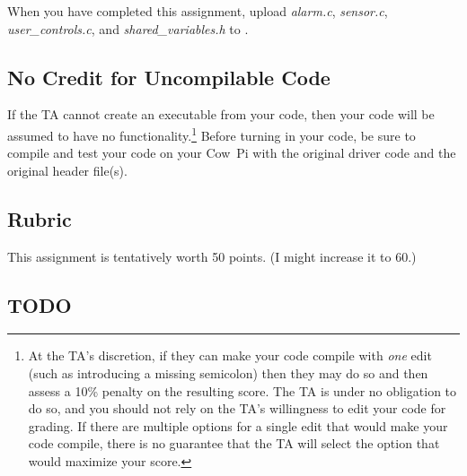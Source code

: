 When you have completed this assignment, upload \textit{alarm.c}, \textit{sensor.c}, \textit{user\_controls.c}, and \textit{shared\_variables.h} to \filesubmission.

\subsection*{No Credit for Uncompilable Code}
If the TA cannot create an executable from your code, then your code will be assumed to have no functionality.\footnote{
    At the TA's discretion, if they can make your code compile with \textit{one} edit (such as introducing a missing semicolon) then they may do so and then assess a 10\% penalty on the resulting score.
    The TA is under no obligation to do so, and you should not rely on the TA's willingness to edit your code for grading.
    If there are multiple options for a single edit that would make your code compile, there is no guarantee that the TA will select the option that would maximize your score.
}
Before turning in your code, be sure to compile and test your code on your Cow~Pi with the original driver code and the original header file(s).

\interruptlablatepolicy

\subsection*{Rubric}

This assignment is tentatively worth 50 points.
(I might increase it to 60.)

\subsection*{TODO}

